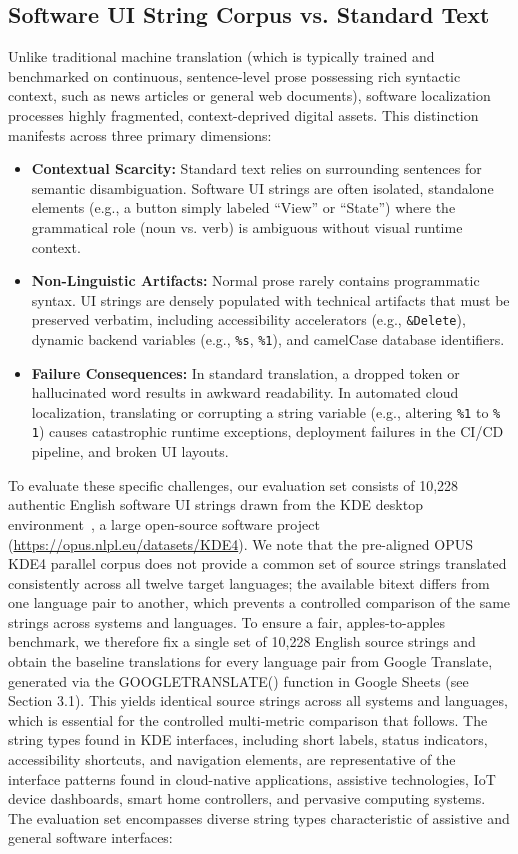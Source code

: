 \documentclass[pdflatex,sn-mathphys-num]{sn-jnl}
\begin{document}
\subsection{Software UI String Corpus vs. Standard Text}

Unlike traditional machine translation (which is typically trained and benchmarked on continuous, sentence-level prose possessing rich syntactic context, such as news articles or general web documents), software localization processes highly fragmented, context-deprived digital assets. This distinction manifests across three primary dimensions:

\begin{itemize}
\item \textbf{Contextual Scarcity:} Standard text relies on surrounding sentences for semantic disambiguation. Software UI strings are often isolated, standalone elements (e.g., a button simply labeled ``View'' or ``State'') where the grammatical role (noun vs. verb) is ambiguous without visual runtime context.
\item \textbf{Non-Linguistic Artifacts:} Normal prose rarely contains programmatic syntax. UI strings are densely populated with technical artifacts that must be preserved verbatim, including accessibility accelerators (e.g., \texttt{\&Delete}), dynamic backend variables (e.g., \texttt{\%s}, \texttt{\%1}), and camelCase database identifiers.
\item \textbf{Failure Consequences:} In standard translation, a dropped token or hallucinated word results in awkward readability. In automated cloud localization, translating or corrupting a string variable (e.g., altering \texttt{\%1} to \texttt{\% 1}) causes catastrophic runtime exceptions, deployment failures in the CI/CD pipeline, and broken UI layouts.
\end{itemize}

To evaluate these specific challenges, our evaluation set consists of 10,228 authentic English software UI strings drawn from the KDE desktop environment~\cite{29}, a large open-source software project (\url{https://opus.nlpl.eu/datasets/KDE4}). We note that the pre-aligned OPUS KDE4 parallel corpus does not provide a common set of source strings translated consistently across all twelve target languages; the available bitext differs from one language pair to another, which prevents a controlled comparison of the same strings across systems and languages. To ensure a fair, apples-to-apples benchmark, we therefore fix a single set of 10,228 English source strings and obtain the baseline translations for every language pair from Google Translate, generated via the GOOGLETRANSLATE() function in Google Sheets (see Section 3.1). This yields identical source strings across all systems and languages, which is essential for the controlled multi-metric comparison that follows. The string types found in KDE interfaces, including short labels, status indicators, accessibility shortcuts, and navigation elements, are representative of the interface patterns found in cloud-native applications, assistive technologies, IoT device dashboards, smart home controllers, and pervasive computing systems. The evaluation set encompasses diverse string types characteristic of assistive and general software interfaces:
\end{document}
